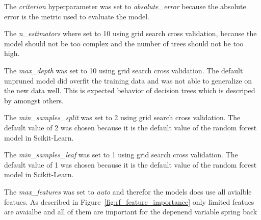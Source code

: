 The \textit{criterion} hyperparameter was set to \textit{absolute\_error} because the absolute
error is the metric
used to evaluate the model.

The \textit{n\_estimators} where set to 10 using grid search cross validation, because the model
should not be too
complex and the number of trees should not be too high.

The \textit{max\_depth} was set to 10 using grid search cross validation. The default unpruned
model did overfit the
training data and was not able to generalize on the new data well. This is expected behavior of
decision trees which
is descriped by \cite[p. 133-136]{muller_introductionmachinelearning_2016} amongst others.

The \textit{min\_samples\_split} was set to 2 using grid search cross validation. The default
value of 2 was chosen
because it is the default value of the random forest model in Scikit-Learn.

The \textit{min\_samples\_leaf} was set to 1 using grid search cross validation. The default
value of 1 was chosen
because it is the default value of the random forest model in Scikit-Learn.

The \textit{max\_features} was set to \textit{auto} and therefor the models does use all avialble
featues. As
described in Figure~\ref{fig:rf_feature_importance} only limited featues are avaialbe and all of
them are important
for the depenend variable spring back

